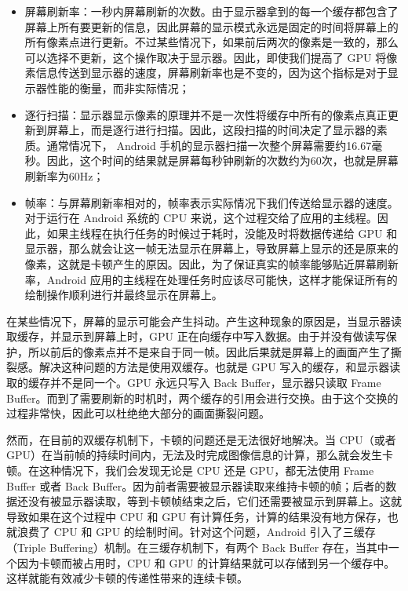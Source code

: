 \begin{itemize}
    \item 屏幕刷新率：一秒内屏幕刷新的次数。由于显示器拿到的每一个缓存都包含了屏幕上所有要更新的信息，因此屏幕的显示模式永远是固定的时间将屏幕上的所有像素点进行更新。不过某些情况下，如果前后两次的像素是一致的，那么可以选择不更新，这个操作取决于显示器。因此，即使我们提高了 GPU 将像素信息传送到显示器的速度，屏幕刷新率也是不变的，因为这个指标是对于显示器性能的衡量，而非实际情况；
    \item 逐行扫描：显示器显示像素的原理并不是一次性将缓存中所有的像素点真正更新到屏幕上，而是逐行进行扫描\cite{张春明2002显示器刷新率的测试以及逐行显示器的辨别方法}。因此，这段扫描的时间决定了显示器的素质。通常情况下， Android 手机的显示器扫描一次整个屏幕需要约16.67毫秒。因此，这个时间的结果就是屏幕每秒钟刷新的次数约为60次，也就是屏幕刷新率为60Hz；
    \item 帧率：与屏幕刷新率相对的，帧率表示实际情况下我们传送给显示器的速度。对于运行在 Android 系统的 CPU 来说，这个过程交给了应用的主线程。因此，如果主线程在执行任务的时候过于耗时，没能及时将数据传递给 GPU 和显示器，那么就会让这一帧无法显示在屏幕上，导致屏幕上显示的还是原来的像素，这就是卡顿产生的原因。因此，为了保证真实的帧率能够贴近屏幕刷新率，Android 应用的主线程在处理任务时应该尽可能快，这样才能保证所有的绘制操作顺利进行并最终显示在屏幕上。
\end{itemize}

在某些情况下，屏幕的显示可能会产生抖动。产生这种现象的原因是，当显示器读取缓存，并显示到屏幕上时，GPU 正在向缓存中写入数据。由于并没有做读写保护，所以前后的像素点并不是来自于同一帧。因此后果就是屏幕上的画面产生了撕裂感\cite{yun2017reducing}。解决这种问题的方法是使用双缓存。也就是 GPU 写入的缓存，和显示器读取的缓存并不是同一个。GPU 永远只写入 Back Buffer，显示器只读取 Frame Buffer。而到了需要刷新的时机时，两个缓存的引用会进行交换。由于这个交换的过程非常快，因此可以杜绝绝大部分的画面撕裂问题。

然而，在目前的双缓存机制下，卡顿的问题还是无法很好地解决。当 CPU（或者 GPU）在当前帧的持续时间内，无法及时完成图像信息的计算，那么就会发生卡顿。在这种情况下，我们会发现无论是 CPU 还是 GPU，都无法使用 Frame Buffer 或者 Back Buffer。因为前者需要被显示器读取来维持卡顿的帧；后者的数据还没有被显示器读取，等到卡顿帧结束之后，它们还需要被显示到屏幕上。这就导致如果在这个过程中 CPU 和 GPU 有计算任务，计算的结果没有地方保存，也就浪费了 CPU 和 GPU 的绘制时间。针对这个问题，Android 引入了三缓存（Triple Buffering）机制\cite{egilmez2017user}。在三缓存机制下，有两个 Back Buffer 存在，当其中一个因为卡顿而被占用时，CPU 和 GPU 的计算结果就可以存储到另一个缓存中。这样就能有效减少卡顿的传递性带来的连续卡顿。

